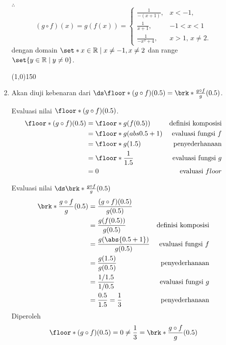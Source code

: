 \begin{enumerate}[leftmargin=*, label={\arabic*}.]
\begin{enumerate}[label={\alph*}.]
$\therefore$ 
\[
    (g\circ f)(x) = g(f(x)) = 
    \begin{cases}
        \frac{1}{-(x+1)}, & x < -1,\\
        \frac{1}{x+1}, &-1 < x < 1 \\
        \frac{1}{-x^{2}+4}, &x > 1,\,x \neq 2.
    \end{cases}
\]
dengan domain $\set*{x \in \mathbb{R} \mid x \neq -1, x\neq 2}$ dan range
$\set{y \in \mathbb{R} \mid y \neq 0}$.
\begin{center}
    \line(1,0){150}
\end{center}
\item Akan diuji kebenaran dari 
$\ds \floor*{(g \circ f)(0.5)} = \brk*{\frac{g \circ f}{g}}(0.5)$.

Evaluasi nilai $\floor*{(g \circ f)(0.5)}$.
\begin{align*}
    \floor*{(g \circ f)(0.5)}
    &= \floor*{g(f(0.5))}
    &\text{definisi komposisi} \\
    &= \floor*{g(abs{0.5+1})} 
    &\text{evaluasi fungsi $f$} \\
    &= \floor*{g(1.5)}
    &\text{penyederhanaan}\\
    &=\floor*{\frac{1}{1.5}}
    &\text{evaluasi fungsi $g$}\\
    &=0 
    &\text{evaluasi $floor$}
\end{align*}

Evaluasi nilai $\ds \brk*{\frac{g \circ f}{g}}(0.5)$
\begin{align*}
    \brk*{\frac{g \circ f}{g}}(0.5) &= \frac{(g\circ f)(0.5)}{g(0.5)}\\
    &= \frac{g(f(0.5))}{g(0.5)} 
    &\text{definisi komposisi}\\
    &= \frac{g(\abs{0.5+1})}{g(0.5)}
    &\text{evaluasi fungsi $f$} \\
    &= \frac{g(1.5)}{g(0.5)} 
    &\text{penyederhanaan}\\
    &= \frac{1/1.5}{1/0.5}
    &\text{evaluasi fungsi $g$}\\
    &=\frac{0.5}{1.5} = \frac{1}{3}
    &\text{penyederhanaan}
\end{align*}
Diperoleh 
\[
    \floor*{(g \circ f)(0.5)} = 0 \neq \frac{1}{3} = \brk*{\frac{g \circ f}{g}}(0.5)
\]


\end{enumerate}
\end{enumerate}
